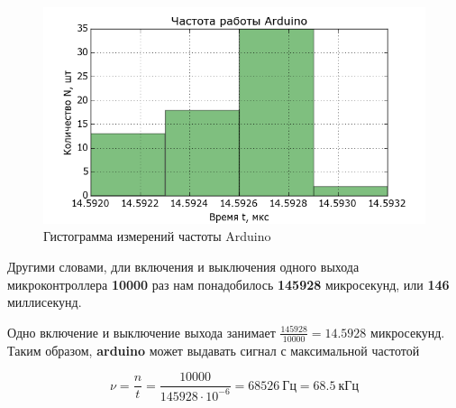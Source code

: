 \begin{figure}[ht]
    \includegraphics[width=.8\linewidth]{Figures/ardhist.png}
    \caption{Гистограмма измерений частоты Arduino}
    \label{fig:ardhist}
\end{figure}

Другими словами, дли включения и выключения одного выхода микроконтроллера \textbf{10000} раз нам понадобилось \textbf{145928} микросекунд, или \textbf{146} миллисекунд.

Одно включение и выключение выхода занимает $\frac{145928}{10000} = 14.5928$ микросекунд. Таким образом, \textbf{arduino} может выдавать сигнал с максимальной частотой

\begin{equation}
    \label{eq:freq1}
    \nu = \frac{n}{t} = \frac{10000}{145928 \cdot 10^{-6}} = 68526~\textrm{Гц} = 68.5~\textrm{кГц}
\end{equation}
